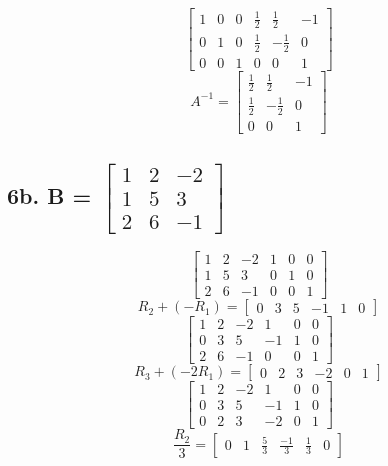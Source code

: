 \documentclass[11pt]{article}
\begin{document}
\[
    \left[
    \begin{array}{ccc|ccc}
        1 & 0 & 0 & \frac{1}{2} & \frac{1}{2} & -1 \\
        0 & 1 & 0 & \frac{1}{2} & -\frac{1}{2} & 0 \\
        0 & 0 & 1 & 0 & 0 & 1
    \end{array}
    \right]
\]
\[A^{-1} = 
    \begin{bmatrix}
        \frac{1}{2} & \frac{1}{2} & -1 \\
        \frac{1}{2} & -\frac{1}{2} & 0 \\
        0 & 0 & 1
    \end{bmatrix}
\]\pagebreak

\subsection*{6b. B = \(
    \begin{bmatrix}
        1 & 2 & -2 \\
        1 & 5 & 3 \\
        2 & 6 & -1
    \end{bmatrix}
    \)}
\[
    \left[
    \begin{array}{ccc|ccc}
        1 & 2 & -2 & 1 & 0 & 0 \\
        1 & 5 & 3 & 0 & 1 & 0 \\
        2 & 6 & -1 & 0 & 0 & 1
    \end{array}
    \right]
\]
\[
    R_2 + (-R_1) = 
    \left[
    \begin{array}{ccc|ccc}
        0 & 3 & 5 & -1 & 1 & 0
    \end{array}
    \right]
\]
\[
    \left[
    \begin{array}{ccc|ccc}
        1 & 2 & -2 & 1 & 0 & 0 \\
        0 & 3 & 5 & -1 & 1 & 0 \\
        2 & 6 & -1 & 0 & 0 & 1
    \end{array}
    \right]
\]
\[
    R_3 + (-2R_1) = 
    \left[
    \begin{array}{ccc|ccc}
        0 & 2 & 3 & -2 & 0 & 1
    \end{array}
    \right]
\]
\[
    \left[
    \begin{array}{ccc|ccc}
        1 & 2 & -2 & 1 & 0 & 0 \\
        0 & 3 & 5 & -1 & 1 & 0 \\
        0 & 2 & 3 & -2 & 0 & 1
    \end{array}
    \right]
\]
\[
    \frac{R_2}{3} = 
    \left[
    \begin{array}{ccc|ccc}
        0 & 1 & \frac{5}{3} & \frac{-1}{3} & \frac{1}{3} & 0
    \end{array}
    \right]
\]
\end{document}
